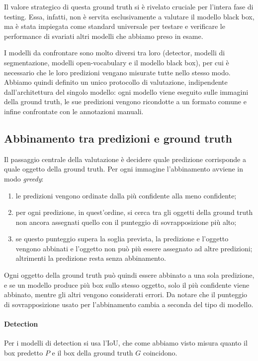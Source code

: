 \noindent
Il valore strategico di questa ground truth si è rivelato cruciale per l'intera fase di testing. Essa, infatti, non è servita esclusivamente a valutare il modello black box, ma è stata impiegata come standard universale
per testare e verificare le performance di svariati altri modelli che abbiamo preso in esame.

\noindent
I modelli da confrontare sono molto diversi tra loro (detector, modelli di segmentazione, modelli open-vocabulary e il modello black box), per cui è necessario che le loro predizioni vengano misurate tutte nello stesso modo.
Abbiamo quindi definito un unico protocollo di valutazione, indipendente dall'architettura del singolo modello: ogni modello viene eseguito sulle immagini della ground truth, le sue predizioni vengono ricondotte a un formato comune
e infine confrontate con le annotazioni manuali.

\subsection{Abbinamento tra predizioni e ground truth}

\noindent
Il passaggio centrale della valutazione è decidere quale predizione corrisponde a quale oggetto della ground truth. Per ogni immagine l'abbinamento avviene in modo \textit{greedy}:
\begin{enumerate}
  \item le predizioni vengono ordinate dalla più confidente alla meno confidente;
  \item per ogni predizione, in quest'ordine, si cerca tra gli oggetti della ground truth non ancora assegnati quello con il punteggio di sovrapposizione più alto;
  \item se questo punteggio supera la soglia prevista, la predizione e l'oggetto vengono abbinati e l'oggetto non può più essere assegnato ad altre predizioni;
        altrimenti la predizione resta senza abbinamento.
\end{enumerate}

\noindent
Ogni oggetto della ground truth può quindi essere abbinato a una sola predizione, e se un modello produce più box sullo stesso oggetto, solo il più confidente viene abbinato, mentre gli altri vengono considerati errori.
Da notare che il punteggio di sovrapposizione usato per l'abbinamento cambia a seconda del tipo di modello.

\newpage

\paragraph{Detection}
Per i modelli di detection si usa l'IoU, che come abbiamo visto misura quanto il box predetto $P$ e il box della ground truth $G$ coincidono.

